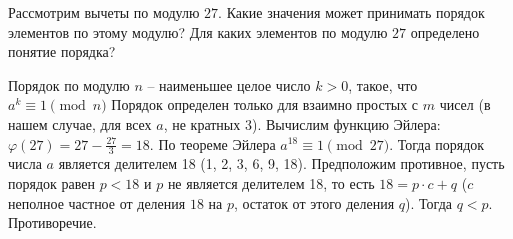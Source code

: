 \begin{task}{96}
Рассмотрим вычеты по модулю $27$. Какие значения может принимать порядок элементов по этому модулю? Для каких элементов по модулю $27$ определено понятие порядка?
\end{task}
\begin{solution}
Порядок по модулю $n$ -- наименьшее целое число $k > 0$, такое, что $a^k \equiv 1 \pmod {n}$
Порядок определен только для взаимно простых с $m$ чисел (в нашем случае, для всех $a$, не кратных $3$). Вычислим функцию Эйлера: $\varphi(27)=27-\frac{27}{3} = 18$. По теореме Эйлера $a^{18} \equiv 1 \pmod {27}$. Тогда порядок числа $a$ является делителем 18 (1, 2, 3, 6, 9, 18). Предположим противное, пусть порядок равен $p < 18$ и $p$ не является делителем 18, то есть $18 = p\cdot c + q$ ($c$ неполное частное от деления $18$ на $p$, остаток от этого деления $q$). Тогда $q < p$. Противоречие.
\end{solution} 